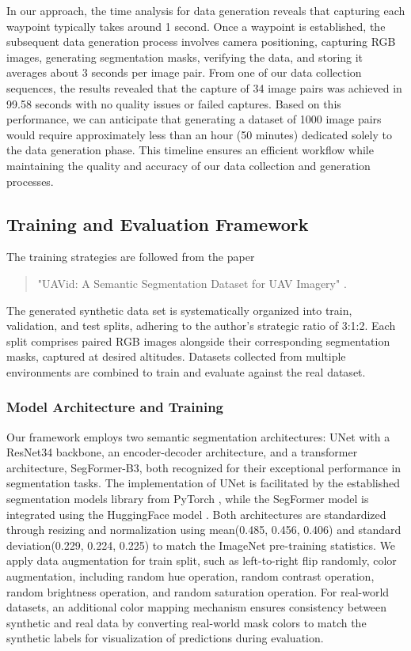 \documentclass[../report.tex]{subfiles}
\begin{document}
    In our approach, the time analysis for data generation reveals that capturing each waypoint typically takes around 1 second. Once a waypoint is established, the subsequent data generation process involves camera positioning, capturing RGB images, generating segmentation masks, verifying the data, and storing it averages about 3 seconds per image pair. From one of our data collection sequences, the results revealed that the capture of 34 image pairs was achieved in 99.58 seconds with no quality issues or failed captures. Based on this performance, we can anticipate that generating a dataset of 1000 image pairs would require approximately less than an hour (50 minutes) dedicated solely to the data generation phase.
    This timeline ensures an efficient workflow while maintaining the quality and accuracy of our data collection and generation processes. 

    \subsection{Training and Evaluation Framework}
    The training strategies are followed from the paper \begin{quote} "UAVid: A Semantic Segmentation Dataset for UAV Imagery" \cite{lyu2020uavid}.
    \end{quote} The generated synthetic data set is systematically organized into train, validation, and test splits, adhering to the author's strategic ratio of 3:1:2. Each split comprises paired RGB images alongside their corresponding segmentation masks, captured at desired altitudes. Datasets collected from multiple environments are combined to train and evaluate against the real dataset. 

    \subsubsection{Model Architecture and Training}
    Our framework employs two semantic segmentation architectures: UNet with a ResNet34 backbone, an encoder-decoder architecture, and a transformer architecture, SegFormer-B3, both recognized for their exceptional performance in segmentation tasks. The implementation of UNet is facilitated by the established segmentation models library from PyTorch \cite{unetsmpmodel}, while the SegFormer model is integrated using the HuggingFace model \cite{huggingfacesegformermodel}. 
    Both architectures are standardized through resizing and normalization using mean(0.485, 0.456, 0.406) and standard deviation(0.229, 0.224, 0.225) to match the ImageNet pre-training statistics. We apply data augmentation for train split, such as left-to-right flip randomly, color augmentation, including random hue operation, random contrast operation, random brightness operation, and random saturation operation.
    For real-world datasets, an additional color mapping mechanism ensures consistency between synthetic and real data by converting real-world mask colors to match the synthetic labels for visualization of predictions during evaluation.
\end{document}
